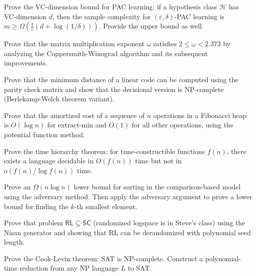 \documentclass[12pt,a4paper]{exam}
\begin{document}
\begin{questions}

\question[7]
Prove the VC-dimension bound for PAC learning: if a hypothesis class $\mathcal{H}$ has VC-dimension $d$, then the sample complexity for $(\varepsilon,\delta)$-PAC learning is $m \geq \Omega(\frac{1}{\varepsilon}(d + \log(1/\delta)))$. Provide the upper bound as well.

\vspace{0.3cm}

\question[5]
Prove that the matrix multiplication exponent $\omega$ satisfies $2 \leq \omega < 2.373$ by analyzing the Coppersmith-Winograd algorithm and its subsequent improvements.

\vspace{0.3cm}

\question[2]
Prove that the minimum distance of a linear code can be computed using the parity check matrix and show that the decisional version is NP-complete (Berlekamp-Welch theorem variant).

\vspace{0.3cm}

\question[2]
Prove that the amortized cost of a sequence of $n$ operations in a Fibonacci heap is $O(\log n)$ for extract-min and $O(1)$ for all other operations, using the potential function method.

\vspace{0.3cm}

\question[4]
Prove the time hierarchy theorem: for time-constructible functions $f(n)$, there exists a language decidable in $O(f(n))$ time but not in $o(f(n)/\log f(n))$ time.

\vspace{0.3cm}

\question[2]
Prove an $\Omega(n \log n)$ lower bound for sorting in the comparison-based model using the adversary method. Then apply the adversary argument to prove a lower bound for finding the $k$-th smallest element.

\vspace{0.3cm}

\question[3]
Prove that problem $\mathsf{RL} \subseteq \mathsf{SC}$ (randomized logspace is in Steve's class) using the Nisan generator and showing that RL can be derandomized with polynomial seed length.

\vspace{0.3cm}

\question[4]
Prove the Cook-Levin theorem: SAT is NP-complete. Construct a polynomial-time reduction from any NP language $L$ to SAT.


\end{questions}
\end{document}
